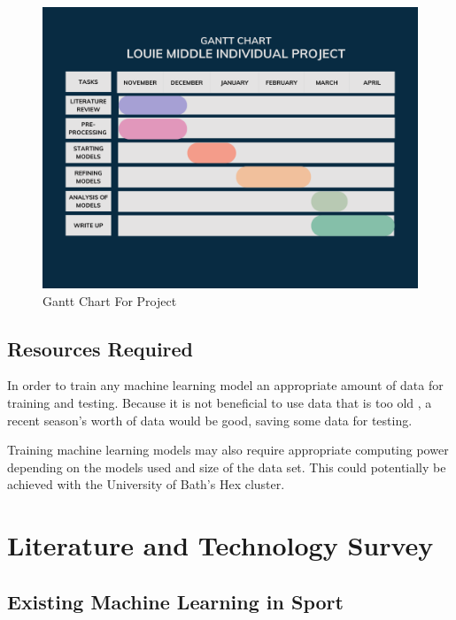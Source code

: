 \documentclass[12pt,a4paper]{report}
\theoremstyle{definition}
\begin{document}
\begin{figure}[H]
    \centering
    \includegraphics[width=\linewidth]{Gantt Chart.png}
    \caption{Gantt Chart For Project}
    \label{fig:gantt_chart}
\end{figure}

\section{Resources Required}

In order to train any machine learning model an appropriate amount of data for training and testing. 
Because it is not beneficial to use data that is too old \citep{horvat2020}, a recent season's worth of data would be good, saving some data for testing. 

Training machine learning models may also require appropriate computing power depending on the models used and size of the data set. 
This could potentially be achieved with the University of Bath's Hex cluster.

\chapter{Literature and Technology Survey}

\section{Existing Machine Learning in Sport}
\end{document}
